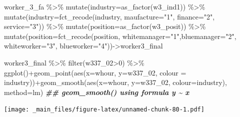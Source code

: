 \documentclass[
]{book}
\newenvironment{Shaded}{\begin{snugshade}}{\end{snugshade}}
\newcommand{\AttributeTok}[1]{\textcolor[rgb]{0.77,0.63,0.00}{#1}}
\newcommand{\DecValTok}[1]{\textcolor[rgb]{0.00,0.00,0.81}{#1}}
\newcommand{\DocumentationTok}[1]{\textcolor[rgb]{0.56,0.35,0.01}{\textbf{\textit{#1}}}}
\newcommand{\FunctionTok}[1]{\textcolor[rgb]{0.00,0.00,0.00}{#1}}
\newcommand{\NormalTok}[1]{#1}
\newcommand{\OtherTok}[1]{\textcolor[rgb]{0.56,0.35,0.01}{#1}}
\newcommand{\SpecialCharTok}[1]{\textcolor[rgb]{0.00,0.00,0.00}{#1}}
\newcommand{\StringTok}[1]{\textcolor[rgb]{0.31,0.60,0.02}{#1}}
\theoremstyle{definition}
\theoremstyle{definition}
\theoremstyle{definition}
\theoremstyle{definition}
\theoremstyle{remark}
\begin{document}
\begin{Shaded}
\begin{Highlighting}[]
\NormalTok{worker\_3\_fa }\SpecialCharTok{\%\textgreater{}\%} 
  \FunctionTok{mutate}\NormalTok{(}\AttributeTok{industry=}\FunctionTok{as\_factor}\NormalTok{(w3\_ind1)) }\SpecialCharTok{\%\textgreater{}\%} 
  \FunctionTok{mutate}\NormalTok{(}\AttributeTok{industry=}\FunctionTok{fct\_recode}\NormalTok{(industry, }\AttributeTok{maufacture=}\StringTok{"1"}\NormalTok{, }\AttributeTok{finance=}\StringTok{"2"}\NormalTok{, }\AttributeTok{service=}\StringTok{"3"}\NormalTok{)) }\SpecialCharTok{\%\textgreater{}\%} 
  \FunctionTok{mutate}\NormalTok{(}\AttributeTok{position=}\FunctionTok{as\_factor}\NormalTok{(w3\_posit)) }\SpecialCharTok{\%\textgreater{}\%} 
  \FunctionTok{mutate}\NormalTok{(}\AttributeTok{position=}\FunctionTok{fct\_recode}\NormalTok{(position, }\AttributeTok{whitemanager=}\StringTok{"1"}\NormalTok{,}\AttributeTok{bluemanager=}\StringTok{"2"}\NormalTok{, }\AttributeTok{whiteworker=}\StringTok{"3"}\NormalTok{, }\AttributeTok{blueworker=}\StringTok{"4"}\NormalTok{))}\OtherTok{{-}\textgreater{}}\NormalTok{worker3\_final}

\NormalTok{worker3\_final }\SpecialCharTok{\%\textgreater{}\%} 
  \FunctionTok{filter}\NormalTok{(w337\_02}\SpecialCharTok{\textgreater{}}\DecValTok{0}\NormalTok{) }\SpecialCharTok{\%\textgreater{}\%} 
  \FunctionTok{ggplot}\NormalTok{()}\SpecialCharTok{+}\FunctionTok{geom\_point}\NormalTok{(}\FunctionTok{aes}\NormalTok{(}\AttributeTok{x=}\NormalTok{whour, }\AttributeTok{y=}\NormalTok{w337\_02, }\AttributeTok{colour =}\NormalTok{ industry))}\SpecialCharTok{+}\FunctionTok{geom\_smooth}\NormalTok{(}\FunctionTok{aes}\NormalTok{(}\AttributeTok{x=}\NormalTok{whour, }\AttributeTok{y=}\NormalTok{w337\_02, }\AttributeTok{colour=}\NormalTok{industry), }\AttributeTok{method=}\StringTok{\textquotesingle{}lm\textquotesingle{}}\NormalTok{)}
\DocumentationTok{\#\# \textasciigrave{}geom\_smooth()\textasciigrave{} using formula \textquotesingle{}y \textasciitilde{} x\textquotesingle{}}
\end{Highlighting}
\end{Shaded}

\texttt{[image: \_main\_files/figure-latex/unnamed-chunk-80-1.pdf]}
\end{document}
